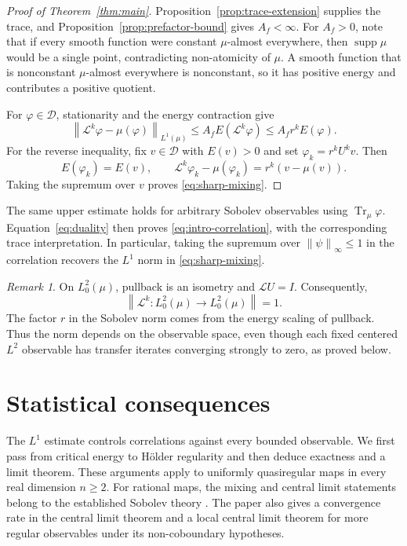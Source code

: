 \documentclass[11pt,reqno]{amsart}
\theoremstyle{plain}
\theoremstyle{definition}
\theoremstyle{remark}
\newtheorem{remark}[theorem]{Remark}
\newcommand{\Lop}{\mathcal L}
\newcommand{\Dcal}{\mathcal D}
\newcommand{\Tr}{\operatorname{Tr}_{\mu}}
\newcommand{\norm}[1]{\left\lVert #1\right\rVert}
\DeclareMathOperator{\supp}{supp}
\numberwithin{equation}{section}
\begin{document}
\begin{proof}[Proof of Theorem~\ref{thm:main}]
Proposition~\ref{prop:trace-extension} supplies the trace, and Proposition~\ref{prop:prefactor-bound} gives $A_f<\infty$. For $A_f>0$, note that if every smooth function were constant $\mu$-almost everywhere, then $\supp\mu$ would be a single point, contradicting non-atomicity of $\mu$. A smooth function that is nonconstant $\mu$-almost everywhere is nonconstant, so it has positive energy and contributes a positive quotient.

For $\varphi\in\Dcal$, stationarity and the energy contraction give
\[
 \norm{\Lop^k\varphi-\mu(\varphi)}_{L^1(\mu)}
 \le A_fE(\Lop^k\varphi)
 \le A_fr^kE(\varphi).
\]
For the reverse inequality, fix $v\in\Dcal$ with $E(v)>0$ and set $\varphi_k=r^kU^kv$. Then
\[
 E(\varphi_k)=E(v),\qquad
 \Lop^k\varphi_k-\mu(\varphi_k)=r^k(v-\mu(v)).
\]
Taking the supremum over $v$ proves \eqref{eq:sharp-mixing}.
\end{proof}

The same upper estimate holds for arbitrary Sobolev observables using $\Tr\varphi$. Equation~\eqref{eq:duality} then proves \eqref{eq:intro-correlation}, with the corresponding trace interpretation. In particular, taking the supremum over $\norm{\psi}_\infty\le1$ in the correlation recovers the $L^1$ norm in \eqref{eq:sharp-mixing}.

\begin{remark}\label{rem:L2-no-gap}
On $L^2_0(\mu)$, pullback is an isometry and $\Lop U=I$. Consequently,
\[
 \norm{\Lop^k\colon L^2_0(\mu)\to L^2_0(\mu)}=1.
\]
The factor $r$ in the Sobolev norm comes from the energy scaling of pullback. Thus the norm depends on the observable space, even though each fixed centered $L^2$ observable has transfer iterates converging strongly to zero, as proved below.
\end{remark}

\section{Statistical consequences}\label{sec:statistics}

The $L^1$ estimate controls correlations against every bounded observable. We first pass from critical energy to H\"older regularity and then deduce exactness and a limit theorem. These arguments apply to uniformly quasiregular maps in every real dimension $n\ge2$. For rational maps, the mixing and central limit statements belong to the established Sobolev theory \cite{DNS07,DS06}. The paper \cite{DNS07} also gives a convergence rate in the central limit theorem and a local central limit theorem for more regular observables under its non-coboundary hypotheses.
\end{document}
